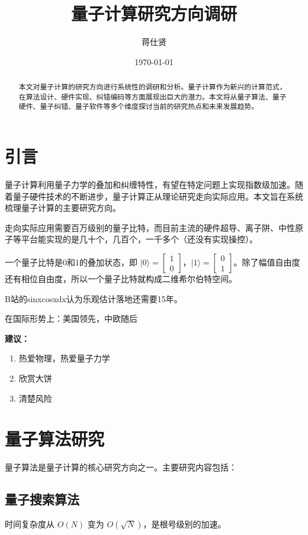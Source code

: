 \documentclass[12pt,a4paper]{article}
\title{量子计算研究方向调研}
\author{蒋仕贤}
\date{\today}
\begin{document}
\maketitle

\begin{abstract}
本文对量子计算的研究方向进行系统性的调研和分析。量子计算作为新兴的计算范式，在算法设计、硬件实现、纠错编码等方面展现出巨大的潜力。本文将从量子算法、量子硬件、量子纠错、量子软件等多个维度探讨当前的研究热点和未来发展趋势。
\end{abstract}

\section{引言}
量子计算利用量子力学的叠加和纠缠特性，有望在特定问题上实现指数级加速。随着量子硬件技术的不断进步，量子计算正从理论研究走向实际应用。本文旨在系统梳理量子计算的主要研究方向。

走向实际应用需要百万级别的量子比特，而目前主流的硬件超导、离子阱、中性原子等平台能实现的是几十个，几百个，一千多个（还没有实现操控）。

一个量子比特是0和1的叠加状态，即 $|0\rangle = \begin{bmatrix} 1 \\ 0 \end{bmatrix}$，$|1\rangle = \begin{bmatrix} 0 \\ 1 \end{bmatrix}$。除了幅值自由度还有相位自由度，所以一个量子比特就构成二维希尔伯特空间。

B站的sinxcosxdx认为乐观估计落地还需要15年。   

在国际形势上：美国领先，中欧随后

\textbf{建议：}
\begin{enumerate}
    \item 热爱物理，热爱量子力学
    \item 欣赏大饼
    \item 清楚风险
\end{enumerate}

\section{量子算法研究}
量子算法是量子计算的核心研究方向之一。主要研究内容包括：

    \subsection{量子搜索算法}
    时间复杂度从 $O(N)$ 变为 $O(\sqrt{N})$，是根号级别的加速。
\end{document}
